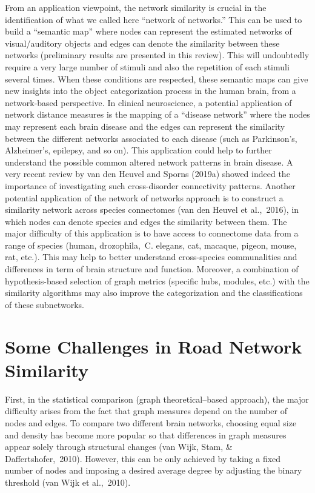 From an application viewpoint, the network similarity is crucial in the identification of what we called here “network of networks.” This can be used to build a “semantic map” where nodes can represent the estimated networks of visual/auditory objects and edges can denote the similarity between these networks (preliminary results are presented in this review). This will undoubtedly require a very large number of stimuli and also the repetition of each stimuli several times. When these conditions are respected, these semantic maps can give new insights into the object categorization process in the human brain, from a network-based perspective.
In clinical neuroscience, a potential application of network distance measures is the mapping of a “disease network” where the nodes may represent each brain disease and the edges can represent the similarity between the different networks associated to each disease (such as Parkinson’s, Alzheimer’s, epilepsy, and so on). This application could help to further understand the possible common altered network patterns in brain disease. A very recent review by van den Heuvel and Sporns (2019a) showed indeed the importance of investigating such cross-disorder connectivity patterns.
Another potential application of the network of networks approach is to construct a similarity network across species connectomes (van den Heuvel et al., 2016), in which nodes can denote species and edges the similarity between them. The major difficulty of this application is to have access to connectome data from a range of species (human, drozophila, C. elegans, cat, macaque, pigeon, mouse, rat, etc.). This may help to better understand cross-species communalities and differences in term of brain structure and function. Moreover, a combination of hypothesis-based selection of graph metrics (specific hubs, modules, etc.) with the similarity algorithms may also improve the categorization and the classifications of these subnetworks.


\section{Some Challenges in Road Network Similarity}
First, in the statistical comparison (graph theoretical–based approach), the major difficulty arises from the fact that graph measures depend on the number of nodes and edges. To compare two different brain networks, choosing equal size and density has become more popular so that differences in graph measures appear solely through structural changes (van Wijk, Stam, & Daffertshofer, 2010). However, this can be only achieved by taking a fixed number of nodes and imposing a desired average degree by adjusting the binary threshold (van Wijk et al., 2010).

